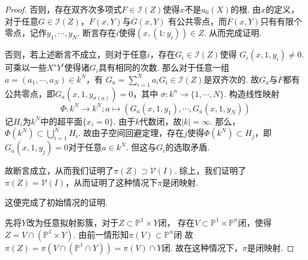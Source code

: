 \begin{proof}
        否则，存在双齐次多项式$F\in\mathcal{I}(Z)$使得$x$不是$a_{0}(X)$的根.
        由$x$的定义，对于任意$G \in \mathcal{I}(Z)$，$\overline{F}(x,Y)$与$\overline{G}(x,Y)$
        有公共零点，而$\overline{F}(x,Y)$只有有限个零点，记作$y_{1},\cdots,y_{N}$.
        断言存在$i$使得$(x,(1:y_{i})) \in Z$. 从而完成证明.

        否则，若上述断言不成立，则对于任意$i$，存在$G_{i} \in \mathcal{I}(Z)$使得
        $G_{i}(x,1,y_{i}) \neq 0$. 可乘以一些$X^{s}Y^{t}$使得诸$G_{i}$具有相同的次数.
        那么对于任意一组$a=(a_{1},\cdots,a_{N}) \in k^{N}$，有
        $G_{a}=\sum_{i=1}^{N}a_{i}G_{i}\in \mathcal{I}(Z)$是双齐次的.
        故$G_{a}$与$\overline{F}$都有公共零点，即$G_{a}(x,1,y_{\sigma(a)})=0$，其中
        $\sigma\colon k^{n} \rightarrow \{1,\cdots,N\}$. 构造线性映射
        \[\Phi\colon k^{N} \rightarrow k^{N};a \mapsto (G_{a}(x,1,y_{1}),\cdots,G_{a}(x,1,y_{N}))\]
        记$H_{i}$为$k^{N}$中的超平面$\{x_{i}=0\}$. 由于$k$代数闭，故$|k|=\infty$.
        那么，$\Phi(k^{N}) \subset \bigcup_{i=1}^{N}H_{i}$.
        故由子空间回避定理，存在$j$使得$\Phi(k^{N}) \subset H_{j}$，即
        $G_{a}(x,1,y_{j})=0$对于任意$a \in k^{N}$. 但这与$G_{i}$的选取矛盾.

        故断言成立，从而我们证明了$\pi(Z)\supset \mathcal{V}(I)$. 综上，我们证明了
        $\pi(Z) = \mathcal{V}(I)$，从而证明了这种情况下$\pi$是闭映射.

        这便完成了初始情况的证明.

        先将$Y$改为任意拟射影簇，对于$Z \subset \mathbb{P}^{1} \times Y$闭，
        存在$V \subset \mathbb{P}^{1} \times \mathbb{P}^{n}$闭，使得
        $Z = V \cap (\mathbb{P}^{1} \times Y)$. 
        由前一情形知$\pi(V) \subset \mathbb{P}^{n}$闭
        故$\pi(Z)=\pi(V \cap (\mathbb{P}^{1} \cap Y)) = \pi(V) \cap Y$闭. 
        故在这种情况下，$\pi$是闭映射.


\end{proof}
